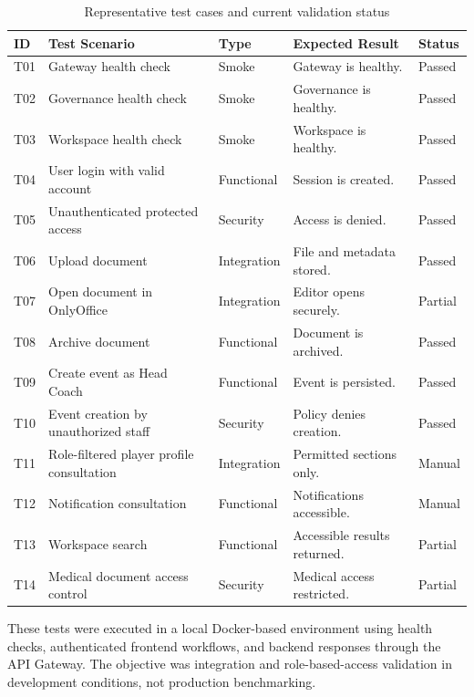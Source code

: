 \begin{table}[!htbp]
\centering
\caption{Representative test cases and current validation status}
\label{tab:test-cases}
{
\scriptsize
\renewcommand{\arraystretch}{1.05}
\setlength{\tabcolsep}{3.4pt}
\begin{tabularx}{\textwidth}{|C{0.7cm}|Y|L{1.4cm}|Y|C{1.2cm}|}
\hline
\textbf{ID} & \textbf{Test Scenario} & \textbf{Type} & \textbf{Expected Result} & \textbf{Status} \\
\hline
T01 & Gateway health check & Smoke & Gateway is healthy. & Passed \\
\hline
T02 & Governance health check & Smoke & Governance is healthy. & Passed \\
\hline
T03 & Workspace health check & Smoke & Workspace is healthy. & Passed \\
\hline
T04 & User login with valid account & Functional & Session is created. & Passed \\
\hline
T05 & Unauthenticated protected access & Security & Access is denied. & Passed \\
\hline
T06 & Upload document & Integration & File and metadata stored. & Passed \\
\hline
T07 & Open document in OnlyOffice & Integration & Editor opens securely. & Partial \\
\hline
T08 & Archive document & Functional & Document is archived. & Passed \\
\hline
T09 & Create event as Head Coach & Functional & Event is persisted. & Passed \\
\hline
T10 & Event creation by unauthorized staff & Security & Policy denies creation. & Passed \\
\hline
T11 & Role-filtered player profile consultation & Integration & Permitted sections only. & Manual \\
\hline
T12 & Notification consultation & Functional & Notifications accessible. & Manual \\
\hline
T13 & Workspace search & Functional & Accessible results returned. & Partial \\
\hline
T14 & Medical document access control & Security & Medical access restricted. & Partial \\
\hline
\end{tabularx}
}
\end{table}

These tests were executed in a local Docker-based environment using health
checks, authenticated frontend workflows, and backend responses through the API
Gateway. The objective was integration and role-based-access validation in
development conditions, not production benchmarking.

